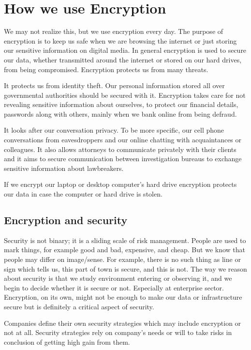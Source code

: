 \chapter{How we use Encryption}\label{encryption}

We may not realize this, but we use encryption every day.
The purpose of encryption is to keep us safe when we are browsing the internet or just storing our sensitive information on digital media.
In general encryption is used to secure our data, whether transmitted around the internet or stored on our hard drives, from being compromised.
Encryption protects us from many threats.

It protects us from identity theft.
Our personal information stored all over governmental authorities should be secured with it.
Encryption takes care for not revealing sensitive information about ourselves, to protect our financial details, passwords along with others, mainly when we bank online from being defraud.

It looks after our conversation privacy.
To be more specific, our cell phone conversations from eavesdroppers and our online chatting with acquaintances or colleagues.
It also allows attorneys to communicate privately with their clients and it aims to secure communication between investigation bureaus to exchange sensitive information about lawbreakers.

If we encrypt our laptop or desktop computer's hard drive encryption protects our data in case the computer or hard drive is stolen.



\section{Encryption and security}

Security is not binary; it is a sliding scale of risk management.
People are used to mark things, for example good and bad, expensive, and cheap.
But we know that people may differ on image/sense.
For example, there is no such thing as line or sign which tells us, this part of town is secure, and this is not.
The way we reason about security is that we study environment entering or observing it, and we begin to decide whether it is secure or not.
Especially at enterprise sector.
Encryption, on its own, might not be enough to make our data or infrastructure secure but is definitely a critical aspect of security.

Companies define their own security strategies which may include encryption or not at all.
Security strategies rely on company's needs or will to take risks in conclusion of getting high gain from them.

